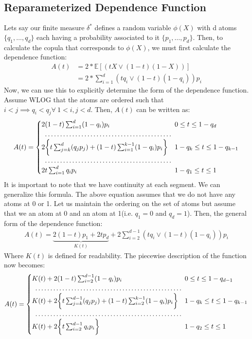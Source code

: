 \documentclass[12pt]{article}
\def\E{\mathbb{E}}
\newcommand{\ds}{\displaystyle}
\theoremstyle{definition}
\theoremstyle{definition}
\begin{document}
\subsection{Reparameterized Dependence Function}
Lets say our finite measure $\delta^*$ defines a random variable $\phi(X)$ with d atoms $\{q_1, \hdots, q_d\}$ each having a probability associated to it $\{p_1, \hdots, p_d\}$. Then, to calculate the copula that corresponds to $\phi(X)$, we must first calculate the dependence function:
\begin{align*}
    A(t)&=2* \E[(tX\vee (1-t)(1-X))]\\
    &=2*\sum_{i=1}^d(tq_i\vee (1-t)(1-q_i))p_i
\end{align*}
Now, we can use this to explicitly determine the form of the dependence function. Assume WLOG that the atoms are ordered such that $i<j \implies q_i<q_j \forall \ 1<i,j<d$. Then, $A(t)$ can be written as:
\begin{align*}
    A(t)=\begin{cases}
    2 (1-t)\sum_{i=1}^d(1-q_i)p_i & 0\leq t\leq 1-q_d\\
    \hdotsfor{1}\\
    2\bigg\{t\sum_{j=k}^d(q_jp_j)+(1-t)\sum_{i=1}^{k-1}(1-q_i)p_i\bigg\}& 1-q_k\leq t\leq 1-q_{k-1}\\
    \hdotsfor{1}\\
    2t\sum_{i=1}^dq_ip_i& 1-q_1\leq t\leq 1
    \end{cases}
\end{align*}
It is important to note that we have continuity at each segment. 
We can generalize this formula. The above equation assumes that we do not have any atoms at 0 or 1. Let us maintain the ordering on the set of atoms but  assume that we an atom at 0 and an atom at 1(i.e. $q_1=0$ and $q_d=1$). Then, the general form of the dependence function:
\begin{align*}
    \ds A(t)=\underbrace{2(1-t)p_1 + 2tp_d}_{K(t)}+2\sum_{i=2}^{d-1}(tq_i\vee (1-t)(1-q_i))p_i \tag{3}
\end{align*}
Where $K(t)$ is defined for readability. The piecewise description of the function now becomes:
\begin{align*}
    A(t)=\begin{cases}
    K(t)+2(1-t)\sum_{i=2}^{d-1}(1-q_i)p_i & 0\leq t\leq 1-q_{d-1}\\
    \hdotsfor{1}\\
    K(t)+2\bigg\{ t\sum_{j=k}^{d-1}(q_jp_j)+(1-t)\sum_{i=2}^{k-1}(1-q_i)p_i\bigg\}& 1-q_k\leq t\leq 1-q_{k-1}\\
    \hdotsfor{1}\\
     K(t)+2\bigg\{t\sum_{i=2}^{d-1}q_ip_i\bigg\}& 1-q_2\leq t\leq 1
    \end{cases}
\end{align*}
\end{document}
